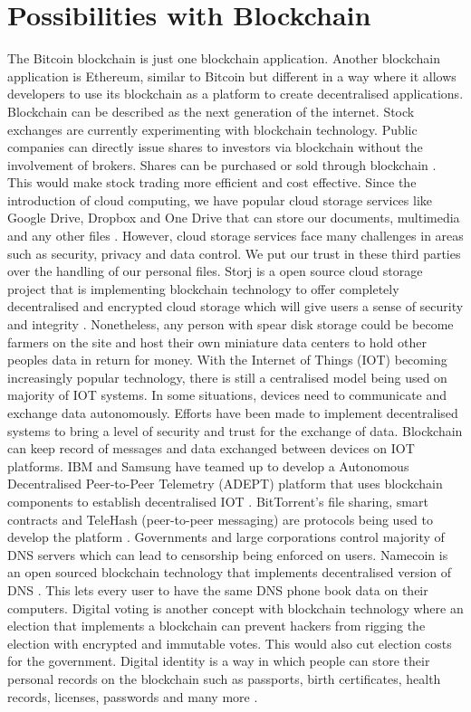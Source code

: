 \documentclass[report]{IEEEtran}
\begin{document}
\section{Possibilities with Blockchain}
The Bitcoin blockchain is just one blockchain application. Another blockchain application is Ethereum, similar to Bitcoin but different in a way where it allows developers to use its blockchain as a platform to create decentralised applications. Blockchain can be described as the next generation of the internet. Stock exchanges are currently experimenting with blockchain technology. Public companies can directly issue shares to investors via blockchain without the involvement of brokers. Shares can be purchased or sold through blockchain \cite{air}. This would make stock trading more efficient and cost effective. Since the introduction of cloud computing, we have popular cloud storage services like Google Drive, Dropbox and One Drive that can store our documents, multimedia and any other files \cite{air}. However, cloud storage services face many challenges in areas such as security, privacy and data control. We put our trust in these third parties over the handling of our personal files. Storj is a open source cloud storage project that is implementing blockchain technology to offer completely decentralised and encrypted cloud storage which will give users a sense of security and integrity \cite{air}. Nonetheless, any person with spear disk storage could be become farmers on the site and host their own miniature data centers to hold other peoples data in return for money. With the Internet of Things (IOT) becoming increasingly popular technology, there is still a centralised model being used on majority of IOT systems. In some situations, devices need to communicate and exchange data autonomously. Efforts have been made to implement decentralised systems to bring a level of security and trust for the exchange of data. Blockchain can keep record of messages and data exchanged between devices on IOT platforms. IBM and Samsung have teamed up to develop a Autonomous Decentralised Peer-to-Peer Telemetry (ADEPT) platform that uses blockchain components to establish decentralised IOT \cite{air}. BitTorrent's file sharing, smart contracts and TeleHash (peer-to-peer messaging) are protocols being used to develop the platform \cite{air}. Governments and large corporations control majority of DNS servers which can lead to censorship being enforced on users. Namecoin is an open sourced blockchain technology that implements decentralised version of DNS \cite{air}. This lets every user to have the same DNS phone book data on their computers. Digital voting is another concept with blockchain technology where an election that implements a blockchain can prevent hackers from rigging the election with encrypted and immutable votes. This would also cut election costs for the government. Digital identity is a way in which people can store their personal records on the blockchain such as passports, birth certificates, health records, licenses, passwords and many more \cite{double}. 
\end{document}
